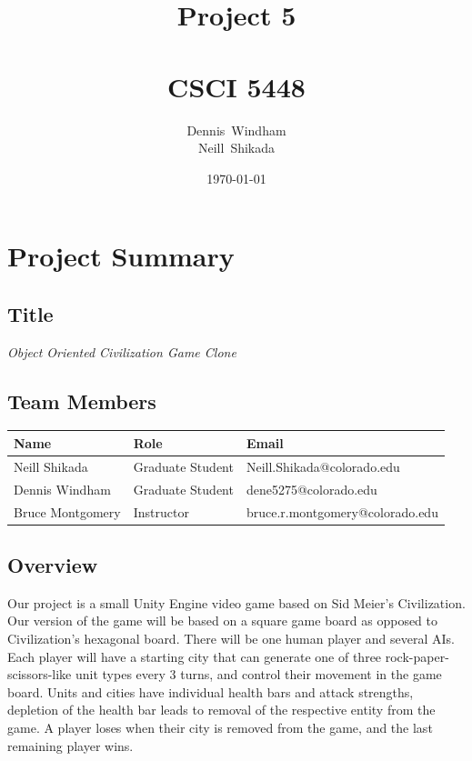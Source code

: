 \documentclass[11pt]{amsart}
\def \fnamea{Dennis}
\def \fnameb{Neill}
\def \lnamea{Windham}
\def \lnameb{Shikada}
\def \class{CSCI 5448}
\def \hwnum{5} %
\def \assgn{Project \hwnum}
\begin{document}
\author[\lnamea]{\fnamea\ \lnamea\\\fnameb\ \lnameb}
\date{\today}
\title[\assgn]{\assgn \\ \ \\\class}
\maketitle
\tableofcontents

\newpage
\section*{\textbf{Project Summary}}
\subsection*{Title}
\begin{center}
    \textit{Object Oriented Civilization Game Clone}
\end{center}

\subsection*{Team Members} \phantom{}

\begin{table}[htbp]
    \begin{tabularx}{\textwidth}{l|l|l}
        \textbf{Name}    & \textbf{Role} & \textbf{Email} \\
        \hline
        Neill Shikada    & Graduate Student & Neill.Shikada@colorado.edu
        \\
        Dennis Windham   & Graduate Student & dene5275@colorado.edu  \\
        Bruce Montgomery & Instructor & bruce.r.montgomery@colorado.edu 
    \end{tabularx}
\end{table}

\subsection*{Overview} \phantom{}

Our project is a small Unity Engine video game based on Sid Meier's Civilization. Our version of the game will be based on a square game board as opposed to Civilization's hexagonal board. There will be one human player and several AIs. Each player will have a starting city that can generate one of three rock-paper-scissors-like unit types every 3 turns, and control their movement in the game board. Units and cities have individual health bars and attack strengths, depletion of the health bar leads to removal of the respective entity from the game. A player loses when their city is removed from the game, and the last remaining player wins.
\end{document}
